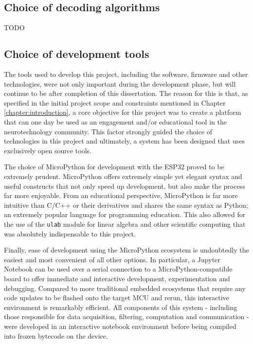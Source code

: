 \subsection{Choice of decoding algorithms}
TODO

\subsection{Choice of development tools}
The tools used to develop this project, including the software, firmware and other technologies, were not only important during the development phase, but will continue to be after completion of this dissertation. The reason for this is that, as specified in the initial project scope and constraints mentioned in Chapter \ref{chapter:introduction}, a core objective for this project was to create a platform that can one day be used as an engagement and/or educational tool in the neurotechnology community. This factor strongly guided the choice of technologies in this project and ultimately, a system has been designed that uses exclusively open source tools. 

The choice of MicroPython for development with the ESP32 proved to be extremely prudent. MicroPython offers extremely simple yet elegant syntax and useful constructs that not only speed up development, but also make the process far more enjoyable. From an educational perspective, MicroPython is far more intuitive than C/C++ or their derivatives and shares the same syntax as Python; an extremely popular language for programming education. This also allowed for the use of the \texttt{ulab} module for linear algebra and other scientific computing that was absolutely indispensable to this project.

Finally, ease of development using the MicroPython ecosystem is undoubtedly the easiest and most convenient of all other options. In particular, a Jupyter Notebook can be used over a serial connection to a MicroPython-compatible board to offer immediate and interactive development, experimentation and debugging. Compared to more traditional embedded ecosystems that require any code updates to be flashed onto the target MCU and rerun, this interactive environment is remarkably efficient. All components of this system - including those responsible for data acquisition, filtering, computation and communication - were developed in an interactive notebook environment before being compiled into frozen bytecode on the device.


